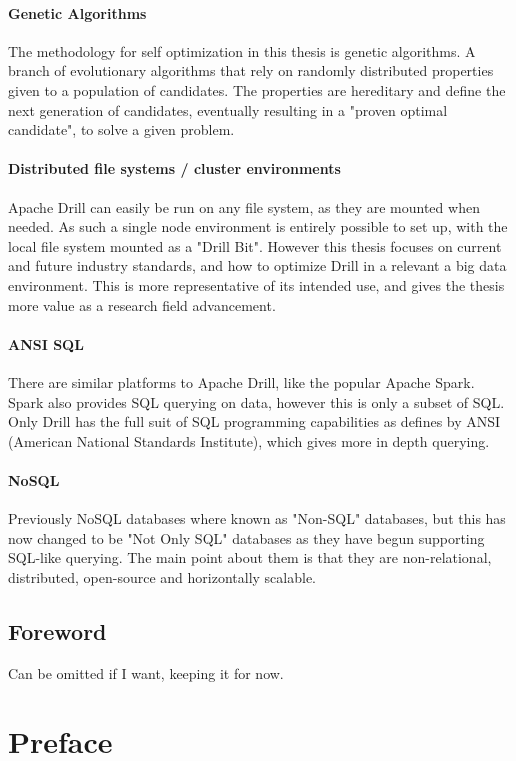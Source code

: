 \documentclass[a4paper,english]{report}
\begin{document}
			\subsubsection{Genetic Algorithms}
			The methodology for self optimization in this thesis is genetic algorithms. A branch of evolutionary algorithms that rely on randomly distributed properties given to a population of candidates. The properties are hereditary and define the next generation of candidates, eventually resulting in a "proven optimal candidate", to solve a given problem.
			\subsubsection{Distributed file systems / cluster environments}
			Apache Drill can easily be run on any file system, as they are mounted when needed. As such a single node environment is entirely possible to set up, with the local file system mounted as a "Drill Bit". However this thesis focuses on current and future industry standards, and how to optimize Drill in a relevant a big data environment. This is more representative of its intended use, and gives the thesis more value as a research field advancement.
			\subsubsection{ANSI SQL}
			There are similar platforms to Apache Drill, like the popular Apache Spark. Spark also provides SQL querying on data, however this is only a subset of SQL. Only Drill has the full suit of SQL programming capabilities as defines by ANSI (American National Standards Institute), which gives more in depth querying.
			\subsubsection{NoSQL}
			Previously NoSQL databases where known as "Non-SQL" databases, but this has now changed to be "Not Only SQL" databases as they have begun supporting SQL-like querying. The main point about them is that they are non-relational, distributed, open-source and horizontally scalable\cite{no_sql}.
	
	\pagebreak
	\section{Foreword}
	Can be omitted if I want, keeping it for now.
	
	\tableofcontents
	
	\chapter{Preface}
\end{document}
